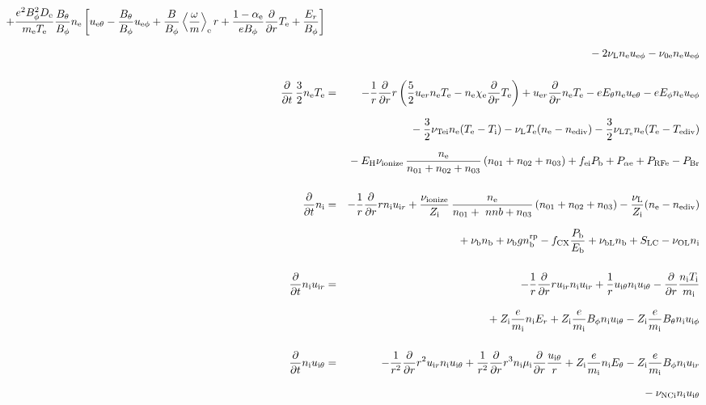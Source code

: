 \documentclass[11pt]{article}
\def\r#1{{\rm#1}}
\def\ddt{\frac{\partial}{\partial t}}
\def\ddr{\frac{\partial}{\partial r}}
\def\ave#1{\left\langle#1\right\rangle}
\def\me{m_\r{e}}
\def\mi{m_\r{i}}
\def\mb{m_\r{b}}
\def\mui{\mu_\r{i}}
\def\De{D_\r{e}}
\def\Di{D_\r{i}}
\def\chie{\chi_\r{e}}
\def\nee{n_\r{e}}
\def\ni{n_\r{i}}
\def\nb{n_\r{b}}
\def\uer{u_{\r{e}r}}
\def\uir{u_{\r{i}r}}
\def\ueth{u_{\r{e}\theta}}
\def\uith{u_{\r{i}\theta}}
\def\ueph{u_{\r{e}\phi}}
\def\uiph{u_{\r{i}\phi}}
\def\ubph{u_{\r{b}\phi}}
\def\Er{E_r}
\def\Eth{E_\theta}
\def\Eph{E_\phi}
\def\Bth{B_\theta}
\def\Bph{B_\phi}
\def\Te{T_\r{e}}
\def\Ti{T_\r{i}}
\def\nna{n_{01}}
\def\nnb{n_{02}}
\def\nnc{n_{03}}
\def\Zi{Z_\r{i}}
\def\Pb{P_\r{b}}
\def\Eb{E_\r{b}}
\def\PRFe{P_\r{RFe}}
\def\PBr{P_\r{Br}}
\def\EH{E_\r{H}}
\def\fei{f_\r{ei}}
\def\nbrp{n_\r{b}^\r{rp}}
\def\fCX{f_\r{CX}}
\def\Palpe{P_{\alpha\r{e}}}
\def\nuNCi{\nu_\r{NCi}}
\def\nube{\nu_\r{be}}
\def\nune{\nu_\r{0e}}
\def\nuL{\nu_\r{L}}
\def\nuion{\nu_\r{ionize}}
\def\nub{\nu_\r{b}}
\def\nuTei{\nu_\r{Tei}}
\def\vb{v_\r{b}}
\def\nediv{n_\r{ediv}}
\def\Tediv{T_\r{ediv}}
\def\nuLTe{\nu_{\r{L}T_\r{e}}}
\def\nuOL{\nu_\r{OL}}
\def\nubL{\nu_\r{bL}}
\begin{document}
\begin{eqnarray}
  + \frac{e^2 \Bph^2 \De}{\me\Te}\frac{\Bth}{\Bph}\nee
    \left[\ueth - \frac{\Bth}{\Bph}\ueph
     + \frac{B}{\Bph}\ave{\frac{\omega}{m}}_\r{e}r
     + \frac{1-\alpha_\r{e}}{e\Bph}\ddr \Te + \frac{\Er}{\Bph}\right]
%
\nonumber\\[2.5mm]&&{}
%
  - 2 \nuL \nee \ueph
%
  - \nune \nee \ueph
%
%
\\[5mm]
  \ddt \, \frac{3}{2} \nee \Te &=&
%
 - \frac{1}{r} \ddr r
   \left( \frac{5}{2} \uer \nee \Te - \nee \chie \ddr \Te \right)
%
  +  \uer \ddr \nee \Te
%
  -  e \Eth \nee \ueth
%
  -  e \Eph \nee \ueph 
\nonumber\\[2.5mm]&&{}
%
  - \frac{3}{2} \nuTei \nee (\Te - \Ti)
%
%
  - \nuL \Te (\nee - \nediv)
%
  - \frac{3}{2} \nuLTe \nee (\Te - \Tediv)
\nonumber\\[2.5mm]&&{}
%
  - \EH \nuion\, \frac{\nee}{\nna + \nnb + \nnc}\, (\nna + \nnb + \nnc)
%
  + \fei \Pb
%
  + \Palpe
%
  + \PRFe
%
  - \PBr
\\[5mm]
%
  \ddt\ni &=&
%
  - \frac{1}{r} \ddr r \ni \uir
%
  + \frac{\nuion}{\Zi}\, \frac{\nee}{\nna +\ nnb + \nnc}\, (\nna + \nnb
  + \nnc)
%
  - \frac{\nuL}{\Zi} (\nee - \nediv) 
\nonumber\\[2.5mm]&&{}
%
  + \nub \nb
%
  + \nub g \nbrp
%
  - \fCX \frac{\Pb}{\Eb}
%
  + \nubL \nb
%
  + S_\r{LC}
%
  - \nuOL \ni
%
\\[5mm]
  \ddt \ni \uir &=&
%
  - \frac{1}{r} \ddr r \uir \ni \uir
%
  + \frac{1}{r} \uith \ni \uith
%
  - \ddr \frac{\ni \Ti}{\mi}
\nonumber\\[3mm]&&{}
%
  + \Zi \frac{e}{\mi}\ni \Er
%
  + \Zi \frac{e}{\mi} \Bph \ni \uith
%
  - \Zi \frac{e}{\mi} \Bth \ni \uiph
\\[5mm]
  \ddt \ni \uith &=&
%
  - \frac{1}{r^2} \ddr r^2 \uir \ni \uith
%
  + \frac{1}{r^2} \ddr r^3 \ni \mui \ddr \frac{\uith}{r}
%
  + \Zi \frac{e}{\mi} \ni \Eth
%
  - \Zi \frac{e}{\mi} \Bph \ni \uir
\nonumber\\[2.5mm]&&{}
%
  - \nuNCi \ni \uith

\end{eqnarray}
\end{document}
